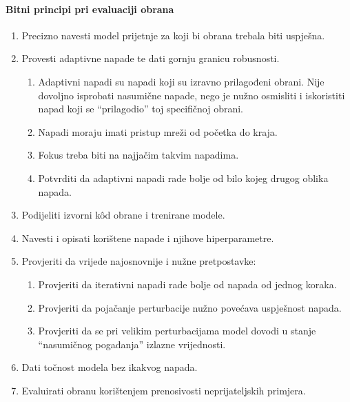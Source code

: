 \documentclass[utf8, diplomski]{fer}
\begin{document}
\paragraph{Bitni principi pri evaluaciji obrana}
\begin{enumerate}[noitemsep,topsep=0pt,parsep=0pt,partopsep=0pt]
	\item Precizno navesti model prijetnje za koji bi obrana trebala biti uspješna.
    \item Provesti adaptivne napade te dati gornju granicu robusnosti.
    \begin{enumerate}[noitemsep,topsep=0pt,parsep=0pt,partopsep=0pt]
    	\item Adaptivni napadi su napadi koji su izravno prilagođeni obrani. Nije dovoljno isprobati nasumične napade, nego je nužno osmisliti i iskoristiti napad koji se ``prilagodio'' toj specifičnoj obrani.
        \item Napadi moraju imati pristup mreži od početka do kraja.
        \item Fokus treba biti na najjačim takvim napadima.
        \item Potvrditi da adaptivni napadi rade bolje od bilo kojeg drugog oblika napada.
    \end{enumerate}
    \item Podijeliti izvorni kôd obrane i trenirane modele.
    \item Navesti i opisati korištene napade i njihove hiperparametre.
    \item Provjeriti da vrijede najosnovnije i nužne pretpostavke:
    \begin{enumerate}[noitemsep,topsep=0pt,parsep=0pt,partopsep=0pt]
    	\item Provjeriti da iterativni napadi rade bolje od napada od jednog koraka.
        \item Provjeriti da pojačanje perturbacije nužno povećava uspješnost napada.
        \item Provjeriti da se pri velikim perturbacijama model dovodi u stanje ``nasumičnog pogađanja'' izlazne vrijednosti.
    \end{enumerate}
    \item Dati točnost modela bez ikakvog napada.
    \item Evaluirati obranu korištenjem prenosivosti neprijateljskih primjera.
\end{enumerate}
\end{document}

